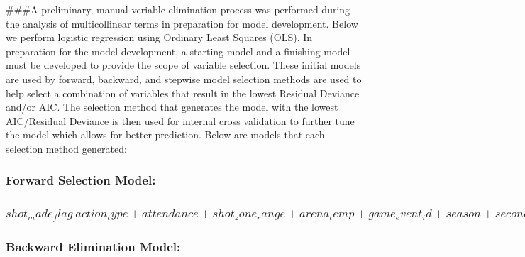 \documentclass[american,]{article}
\begin{document}
\#\#\#A preliminary, manual veriable elimination process was performed during the analysis of multicollinear terms in preparation for model development. Below we perform logistic regression using Ordinary Least Squares (OLS). In preparation for the model development, a starting model and a finishing model must be developed to provide the scope of variable selection. These initial models are used by forward, backward, and stepwise model selection methods are used to help select a combination of variables that result in the lowest Residual Deviance and/or AIC. The selection method that generates the model with the lowest AIC/Residual Deviance is then used for internal cross validation to further tune the model which allows for better prediction. Below are models that each selection method generated:

\hypertarget{forward-selection-model}{%
\subsubsection{Forward Selection Model:}\label{forward-selection-model}}

\hypertarget{shot_made_flag-action_type-attendance-shot_zone_range-arena_temp-game_event_id-season-seconds_remaining-shot_zone_basic-loc_y-minutes_remaining-loc_x-game_date}{%
\subsubsection{\texorpdfstring{\(shot_made_flag ~ action_type + attendance + shot_zone_range + arena_temp + game_event_id + season + seconds_remaining + shot_zone_basic + loc_y + minutes_remaining + loc_x + game_date\)}{shot\_made\_flag \textasciitilde{} action\_type + attendance + shot\_zone\_range + arena\_temp + game\_event\_id + season + seconds\_remaining + shot\_zone\_basic + loc\_y + minutes\_remaining + loc\_x + game\_date}}\label{shot_made_flag-action_type-attendance-shot_zone_range-arena_temp-game_event_id-season-seconds_remaining-shot_zone_basic-loc_y-minutes_remaining-loc_x-game_date}}

\hypertarget{backward-elimination-model}{%
\subsubsection{Backward Elimination Model:}\label{backward-elimination-model}}
\end{document}
